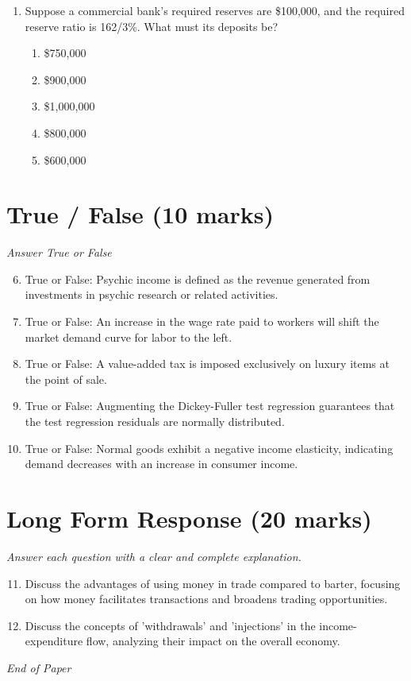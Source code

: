 \documentclass[12pt]{article}
\begin{document}
\begin{enumerate}[label=\arabic*.]
\begin{enumerate}[label=(\alph*)]
    \item the average wage is higher.
    \item the national debt is lower.
    \item production is higher.
    \item prices are higher.
    \item employment is higher.
\end{enumerate}
\item Suppose a commercial bank's required reserves are \$100,000, and the required reserve ratio is 162/3\%. What must its deposits be?
\begin{enumerate}[label=(\alph*)]
    \item \$750,000
    \item \$900,000
    \item \$1,000,000
    \item \$800,000
    \item \$600,000
\end{enumerate}
\end{enumerate}

\section*{True / False (10 marks)}
\textit{Answer True or False}
\begin{enumerate}[label=\arabic*.]
\setcounter{enumi}{5}
\item True or False: Psychic income is defined as the revenue generated from investments in psychic research or related activities.
\item True or False: An increase in the wage rate paid to workers will shift the market demand curve for labor to the left.
\item True or False: A value-added tax is imposed exclusively on luxury items at the point of sale.
\item True or False: Augmenting the Dickey-Fuller test regression guarantees that the test regression residuals are normally distributed.
\item True or False: Normal goods exhibit a negative income elasticity, indicating demand decreases with an increase in consumer income.
\end{enumerate}

\section*{Long Form Response (20 marks)}
\textit{Answer each question with a clear and complete explanation.}
\begin{enumerate}[label=\arabic*.]
\setcounter{enumi}{10}
\item Discuss the advantages of using money in trade compared to barter, focusing on how money facilitates transactions and broadens trading opportunities.
\item Discuss the concepts of 'withdrawals' and 'injections' in the income-expenditure flow, analyzing their impact on the overall economy.
\end{enumerate}

\vfill
\noindent\textit{End of Paper}
\end{document}
